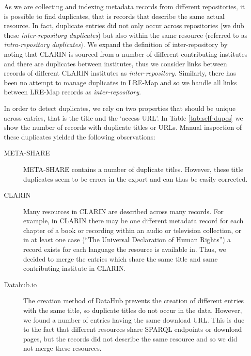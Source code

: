 \documentclass[11pt]{article}
\begin{document}
As we are collecting and indexing metadata records from different repositories,
it is possible to find duplicates, that is records that describe the same actual
resource.
In fact, duplicate entries did not only occur across repositories
(we dub these \emph{inter-repository duplicates}) but also within the same
resource (referred to as \emph{intra-repository duplicates}). 
We expand the
definition of inter-repository by noting that CLARIN 
is sourced from a number of different contributing institutes and there are
duplicates between institutes, thus we consider links between records
of different CLARIN institutes as \emph{inter-repository}. Similarly, there has
been no attempt to manage duplicates in LRE-Map and so we handle all links
between LRE-Map records as \emph{inter-repository}.

In order to detect duplicates, we rely on two properties
that should be unique across entries, that is the title and the `access URL'.
In Table
\ref{tab:self-dupes} we show the number of records with duplicate titles or URLs.
Manual inspection of these duplicates yielded the following
observations:

\begin{description}

	\item[META-SHARE] META-SHARE contains a number of duplicate titles.
            However, these title duplicates seem to be errors in the export and can thus be easily corrected. 

    \item[CLARIN] Many resources in CLARIN are described across many records.
        For example, in CLARIN there may be one different metadata record for each chapter of a book or
        recording within an audio or television collection, or in at least one case
        (``The Universal Declaration of Human Rights'') a record exists for each
        language the resource is available in. Thus, we decided to merge the entries which
        share the same title and same contributing institute in CLARIN.
        
    \item[Datahub.io] The creation method of DataHub prevents the creation of
        different entries with the same title, so duplicate titles do not occur
        in the data. However, we found a number of entries having the same
        download URL. This is due to the fact that different resources share
        SPARQL endpoints or download pages, but the records did not describe the
        same resource and so we did not merge these resources.
    
\end{description}
\end{document}
